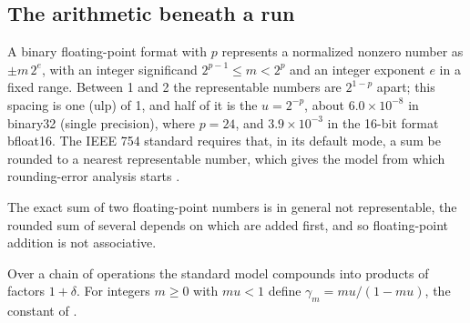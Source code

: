 \begin{refsection}
\subsection{The arithmetic beneath a run}\label{sec:instability:arithmetic}

A binary floating-point format with  $p$ represents a normalized nonzero number as $\pm m\,2^{e}$, with an integer significand $2^{p-1}\le m<2^p$ and an integer exponent $e$ in a fixed range. Between 1 and 2 the representable numbers are $2^{1-p}$ apart; this spacing is one  (ulp) of 1, and half of it is the  $u=2^{-p}$, about $6.0\times10^{-8}$ in binary32 (single precision), where $p=24$, and $3.9\times10^{-3}$ in the 16-bit format bfloat16. The IEEE 754 standard \parencite{IEEE2019} requires that, in its default mode, a sum be rounded to a nearest representable number, which gives the model from which rounding-error analysis starts \parencite[Section~2.2]{Higham2002}.


The exact sum of two floating-point numbers is in general not representable, the rounded sum of several depends on which are added first, and so floating-point addition is not associative.


Over a chain of operations the standard model compounds into products of factors $1+\delta$. For integers $m\ge0$ with $mu<1$ define $\gamma_m=mu/(1-mu)$, the constant of \textcite[Lemma~3.1]{Higham2002}.


\end{refsection}
